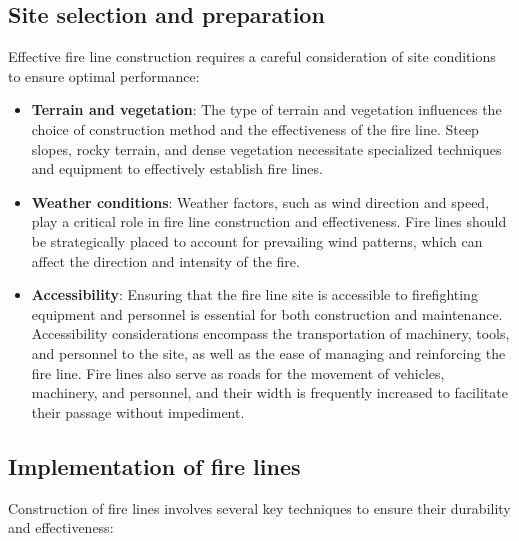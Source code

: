 \documentclass[
  12 pt,
]{Nemilov}
\begin{document}
\subsection{Site selection and preparation}\label{site-selection-and-preparation}

Effective fire line construction requires a careful consideration of site conditions to ensure optimal performance:

\begin{itemize}
\item
  \textbf{Terrain and vegetation}: The type of terrain and vegetation influences the choice of construction method and the effectiveness of the fire line. Steep slopes, rocky terrain, and dense vegetation necessitate specialized techniques and equipment to effectively establish fire lines.
\item
  \textbf{Weather conditions}: Weather factors, such as wind direction and speed, play a critical role in fire line construction and effectiveness. Fire lines should be strategically placed to account for prevailing wind patterns, which can affect the direction and intensity of the fire.
\item
  \textbf{Accessibility}: Ensuring that the fire line site is accessible to firefighting equipment and personnel is essential for both construction and maintenance. Accessibility considerations encompass the transportation of machinery, tools, and personnel to the site, as well as the ease of managing and reinforcing the fire line. Fire lines also serve as roads for the movement of vehicles, machinery, and personnel, and their width is frequently increased to facilitate their passage without impediment.
\end{itemize}

\subsection{Implementation of fire lines}\label{implementation-of-fire-lines}

Construction of fire lines involves several key techniques to ensure their durability and effectiveness:
\end{document}

